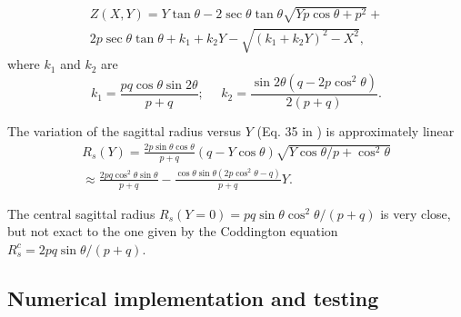 \documentclass{iucr}              %
\begin{document}
\begin{multline}
\label{eqn:parabolicCone}
Z(X,Y) = Y \tan\theta - 2 \sec\theta \tan\theta
\sqrt{Y p \cos\theta + p^2} + \\
2 p \sec\theta \tan\theta +
k_1 + k_2 Y - \sqrt{(k_1 + k_2 Y)^2 - X^2},
\end{multline}
where $k_1$ and $k_2$ are
\begin{equation}
k_1 = \frac{p q \cos\theta \sin2\theta}{p+q};~~~~~~
k_2 = \frac{\sin2\theta(q-2p\cos^2\theta)}{2(p+q)}.
\end{equation}



The variation of the sagittal radius versus $Y$  (Eq. 35 in \cite{part2}) is approximately linear
\begin{multline}
\label{eq:sagRadius}
R_s(Y) = \frac{2  p \sin\theta \cos\theta}{p + q} (q - Y \cos\theta)   \sqrt{Y \cos\theta / p + \cos^2\theta} \\
\approx 
\frac{2p q \cos^2\theta \sin\theta  }{p + q} - 
\frac{\cos\theta \sin\theta (2 p \cos^2\theta - q)}{p + q} Y.
\end{multline}

The central sagittal radius $R_s(Y=0)=p q \sin\theta \cos^2\theta/ (p+q)$ is very close, but not exact to the one given by the Coddington equation $R_s^c=2 p q \sin\theta / (p+q)$.


\subsection{Numerical implementation and testing}
\label{sec:oasys}
\end{document}
